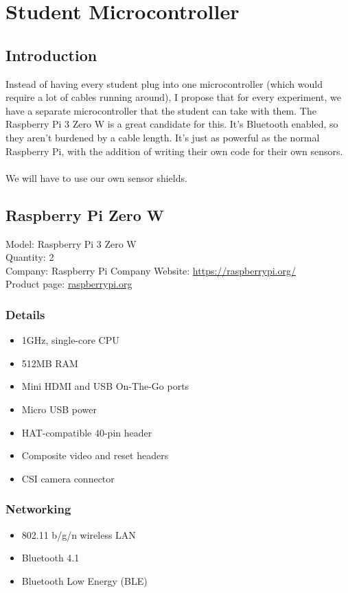 \section{Student Microcontroller}

\subsection{Introduction}
Instead of having every student plug into one microcontroller (which would require a lot of cables running around), I propose that for every experiment, we have a separate microcontroller that the student can take with them. The Raspberry Pi 3 Zero W is a great candidate for this. It’s Bluetooth enabled, so they aren’t burdened by a cable length. It’s just as powerful as the normal Raspberry Pi, with the addition of writing their own code for their own sensors. \\
 \\
We will have to use our own sensor shields.

\subsection{Raspberry Pi Zero W}
Model: Raspberry Pi 3 Zero W \\
Quantity: 2 \\
Company: Raspberry Pi
Company Website: \href{https://raspberrypi.org/}{https://raspberrypi.org/} \\
Product page: \href{https://www.adafruit.com/product/3400?gclid=EAIaIQobChMI9Lbyu_qU4wIVDp6fCh3MuA5QEAQYASABEgJT5PD_BwE/}{raspberrypi.org} \\
\subsubsection{ Details }
\begin{itemize}
	\item 1GHz, single-core CPU
	\item 512MB RAM
	\item Mini HDMI and USB On-The-Go ports
	\item Micro USB power
	\item HAT-compatible 40-pin header
	\item Composite video and reset headers
	\item CSI camera connector
\end{itemize}

\subsubsection{Networking}
\begin{itemize}
	\item 802.11 b/g/n wireless LAN
	\item Bluetooth 4.1
	\item Bluetooth Low Energy (BLE)
\end{itemize}

